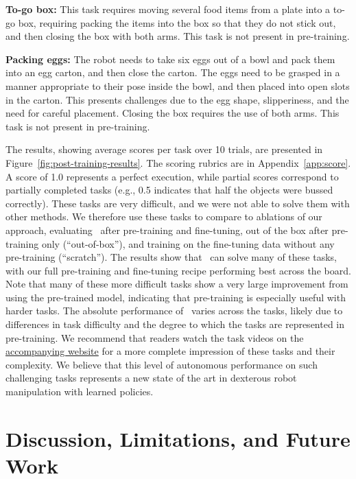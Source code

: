\noindent \textbf{To-go box:} This task requires moving several food items from a plate into a to-go box, requiring packing the items into the box so that they do not stick out, and then closing the box with both arms. This task is not present in pre-training.

\noindent \textbf{Packing eggs:} The robot needs to take six eggs out of a bowl and pack them into an egg carton, and then close the carton. The eggs need to be grasped in a manner appropriate to their pose inside the bowl, and then placed into open slots in the carton. This presents challenges due to the egg shape, slipperiness, and the need for careful placement. Closing the box requires the use of both arms. This task is not present in pre-training.

The results, showing average scores per task over 10 trials, are presented in Figure~\ref{fig:post-training-results}. The scoring rubrics are in Appendix~\ref{app:score}. A score of 1.0 represents a perfect execution, while partial scores correspond to partially completed tasks (e.g., 0.5 indicates that half the objects were bussed correctly). These tasks are very difficult, and we were not able to solve them with other methods. We therefore use these tasks to compare to ablations of our approach, evaluating \ModelSymbol\ after pre-training and fine-tuning, out of the box after pre-training only (``out-of-box''), and training on the fine-tuning data without any pre-training (``scratch''). The results show that \ModelSymbol\ can solve many of these tasks, with our full pre-training and fine-tuning recipe performing best across the board. Note that many of these more difficult tasks show a very large improvement from using the pre-trained model, indicating that pre-training is especially useful with harder tasks. The absolute performance of \ModelSymbol\ varies across the tasks, likely due to differences in task difficulty and the degree to which the tasks are represented in pre-training. We recommend that readers watch the task videos on the \href{https://physicalintelligence.company/blog/pi0}{accompanying website} for a more complete impression of these tasks and their complexity. We believe that this level of autonomous performance on such challenging tasks represents a new state of the art in dexterous robot manipulation with learned policies.

\section{Discussion, Limitations, and Future Work}

